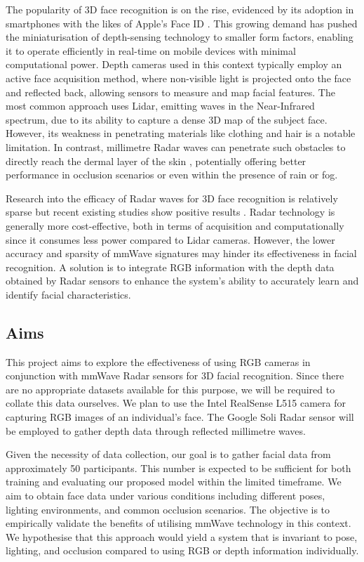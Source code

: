 \documentclass{interim}
\begin{document}
The popularity of 3D face recognition is on the rise, evidenced by its adoption in smartphones with the likes of Apple's Face ID \cite{apple-faceid}. This growing demand has pushed the miniaturisation of depth-sensing technology to smaller form factors, enabling it to operate efficiently in real-time on mobile devices with minimal computational power. Depth cameras used in this context typically employ an active face acquisition method, where non-visible light is projected onto the face and reflected back, allowing sensors to measure and map facial features. The most common approach uses Lidar, emitting waves in the Near-Infrared spectrum, due to its ability to capture a dense 3D map of the subject face. However, its weakness in penetrating materials like clothing and hair is a notable limitation. In contrast, millimetre Radar waves can penetrate such obstacles to directly reach the dermal layer of the skin \cite{vizard2006advances}, potentially offering better performance in occlusion scenarios or even within the presence of rain or fog.

Research into the efficacy of Radar waves for 3D face recognition is relatively sparse but recent existing studies show positive results \cite{hof2020face, lim2020dnn,kim2020face, pho2021radar,challa2021face}. Radar technology is generally more cost-effective, both in terms of acquisition and computationally since it consumes less power compared to Lidar cameras. However, the lower accuracy and sparsity of mmWave signatures may hinder its effectiveness in facial recognition. A solution is to integrate RGB information with the depth data obtained by Radar sensors to enhance the system's ability to accurately learn and identify facial characteristics.


\subsection{Aims}
This project aims to explore the effectiveness of using RGB cameras in conjunction with mmWave Radar sensors for 3D facial recognition. Since there are no appropriate datasets available for this purpose, we will be required to collate this data ourselves. We plan to use the Intel RealSense L515 camera \cite{intel-l515} for capturing RGB images of an individual's face. The Google Soli Radar sensor \cite{lien2016soli} will be employed to gather depth data through reflected millimetre waves. 

Given the necessity of data collection, our goal is to gather facial data from approximately 50 participants. This number is expected to be sufficient for both training and evaluating our proposed model within the limited timeframe. We aim to obtain face data under various conditions including different poses, lighting environments, and common occlusion scenarios. The objective is to empirically validate the benefits of utilising mmWave technology in this context. We hypothesise that this approach would yield a system that is invariant to pose, lighting, and occlusion compared to using RGB or depth information individually.
\end{document}
